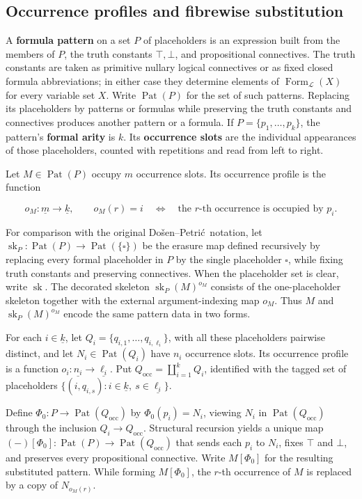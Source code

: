 \documentclass[11pt]{article}
\newcommand{\finord}[1]{\underline{#1}}
\newcommand{\DP}{Do\v{s}en--Petri\'{c}}
\theoremstyle{definition}
\begin{document}
\subsection{Occurrence profiles and fibrewise substitution}

A \textbf{formula pattern} on a set \(P\) of placeholders is
an expression built from the members of \(P\), the truth constants
\(\top,\bot\), and propositional connectives. The truth constants are taken as
primitive nullary logical connectives or as fixed closed formula
abbreviations; in either case they determine elements of
\(\operatorname{Form}_{\mathcal L}(X)\) for every variable set \(X\). Write
\(\operatorname{Pat}(P)\) for the set of such patterns. Replacing its
placeholders by patterns or formulas while preserving the truth constants and
connectives produces another pattern or a formula. If
\(P=\{p_1,\ldots,p_k\}\), the pattern's \textbf{formal arity} is \(k\). Its
\textbf{occurrence slots} are the individual appearances of those
placeholders, counted with repetitions and read from left to right.

Let \(M\in\operatorname{Pat}(P)\) occupy \(m\) occurrence slots. Its
occurrence profile is the function

\[
o_M:\finord m\longrightarrow\finord k,
\qquad
o_M(r)=i
\quad\Longleftrightarrow\quad
\text{the \(r\)-th occurrence is occupied by \(p_i\)}.
\]

For comparison with the original \DP\ notation, let
\(\operatorname{sk}_P:\operatorname{Pat}(P)\to
\operatorname{Pat}(\{\square\})\) be the erasure map defined recursively by
replacing every formal placeholder in \(P\) by the single placeholder
\(\square\), while fixing truth constants and preserving connectives. When
the placeholder set is clear, write \(\operatorname{sk}\). The decorated
skeleton \(\operatorname{sk}_P(M)^{o_M}\) consists of the one-placeholder
skeleton together with the external argument-indexing map \(o_M\). Thus
\(M\) and \(\operatorname{sk}_P(M)^{o_M}\) encode the same pattern data in
two forms.

For each \(i\in\finord k\), let
\(Q_i=\{q_{i,1},\ldots,q_{i,\ell_i}\}\), with all these placeholders pairwise
distinct, and let \(N_i\in\operatorname{Pat}(Q_i)\) have \(n_i\) occurrence
slots. Its occurrence profile is a function
\(o_i:\finord{n_i}\to\finord{\ell_i}\). Put
\(Q_{\mathrm{occ}}=\coprod_{i=1}^k Q_i\), identified with the tagged set of placeholders
\(\{(i,q_{i,s}):i\in\finord k,\ s\in\finord{\ell_i}\}\).

Define \(\Phi_0:P\to\operatorname{Pat}(Q_{\mathrm{occ}})\) by
\(\Phi_0(p_i)=N_i\), viewing \(N_i\) in
\(\operatorname{Pat}(Q_{\mathrm{occ}})\) through the
inclusion \(Q_i\to Q_{\mathrm{occ}}\). Structural recursion yields a unique map
\((-)[\Phi_0]:\operatorname{Pat}(P)\to
\operatorname{Pat}(Q_{\mathrm{occ}})\) that sends each
\(p_i\) to \(N_i\), fixes \(\top\) and \(\bot\), and preserves every
propositional connective. Write \(M[\Phi_0]\) for the resulting substituted
pattern. While forming \(M[\Phi_0]\), the \(r\)-th occurrence of \(M\) is
replaced by a copy of \(N_{o_M(r)}\).
\end{document}
